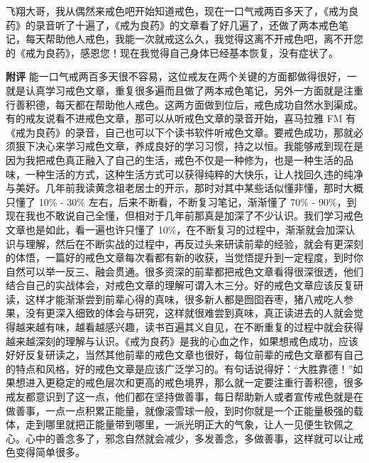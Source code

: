 \begin{case}
    飞翔大哥，我从偶然来戒色吧开始知道戒色，现在一口气戒两百多天了，《戒为良药》的录音听了十遍了，《戒为良药》的文章看了好几遍了，还做了两本戒色笔记，每天帮助他人戒色，我能一次就戒这么久，我觉得这离不开戒色吧，离不开您的《戒为良药》，感恩您！现在我觉得自己身体已经基本恢复，没有症状了。

    \textbf{附评} 能一口气戒两百多天很不容易，这位戒友在两个关键的方面都做得很好，一就是认真学习戒色文章，重复很多遍而且做了两本戒色笔记，另外一方面就是注重行善积德，每天都在帮助他人戒色。这两方面做到位后，戒色成功自然水到渠成。有的戒友说看不进戒色文章，那可以从听戒色文章的录音开始，喜马拉雅 FM 有《戒为良药》的录音，自己也可以下个读书软件听戒色文章。要戒色成功，那就必须狠下决心来学习戒色文章，养成良好的学习习惯，持之以恒。我能够戒到现在是因为我把戒色真正融入了自己的生活，戒色不仅是一种修为，也是一种生活的品味，一种生活的方式，这种生活方式可以获得纯粹的大快乐，让人找回久违的纯净与美好。几年前我读黄念祖老居士的开示，那时对其中某些话似懂非懂，那时大概只懂了 10\% - 30\% 左右，后来不断看，不断复习笔记，渐渐懂了 70\% - 90\%，到现在我也不敢说自己全懂，但相对于几年前那真是加深了不少认识。我们学习戒色文章也是如此，看一遍也许只懂了 10\%，在不断复习的过程中，渐渐就会加深认识与理解，然后在不断实战的过程中，再反过头来研读前辈的经验，就会有更深刻的体悟，一篇好的戒色文章每次看都有新的收获，当觉悟提升到一定程度，到时你自然可以举一反三、融会贯通。很多资深的前辈都把戒色文章看得很深很透，他们结合自己的实战体会，对戒色文章的理解可谓入木三分。好的戒色文章应该反复研读，这样才能渐渐尝到前辈心得的真味，很多新人都是囫囵吞枣，猪八戒吃人参果，没有更深入细致的体会与研究，这样就很难尝到真味，真正读进去的人就会觉得越来越有味，越看越感兴趣，读书百遍其义自见，在不断重复的过程中就会获得越来越深刻的理解与认识。《戒为良药》是我的心血之作，如果想戒色成功，应该好好反复研读之，当然其他前辈的戒色文章也很好，每位前辈的戒色文章都有自己的特点和风格，好的戒色文章是应该广泛学习的。有句话说得好：“大胜靠德！”如果想进入更稳定的戒色层次和更高的戒色境界，那么就一定要注重行善积德，很多戒友都意识到了这一点，他们都在坚持做善事，每日帮助新人或者宣传戒色就是在做善事，一点一点积累正能量，就像滚雪球一般，到时你就是一个正能量极强的载体，走到哪里就把正能量带到哪里，一派光明正大的气象，让人一见便生钦佩之心。心中的善念多了，邪念自然就会减少，多发善念，多做善事，这样就可以让戒色变得简单很多。
\end{case}

